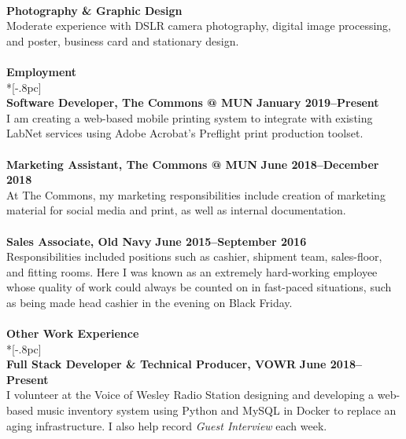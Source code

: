 \documentclass[letterpaper]{article}
\let\dateshape\bf
\begin{document}
\\
{\bf Photography \& Graphic Design} \\
Moderate experience with DSLR camera photography, digital image processing, and poster, business card and stationary design.  \\
\\[0.5pc]
{\large \bf Employment} \\*[-.8pc]
\underline{\hspace{\textwidth}} \\[0.5pc]
{\bf Software Developer, The Commons @ MUN } \hfill {\dateshape January 2019--Present\/} \\
I am creating a web-based mobile printing system to integrate with existing LabNet
services using Adobe Acrobat's Preflight print production toolset. \\
\\
{\bf Marketing Assistant, The Commons @ MUN } \hfill {\dateshape June 2018--December 2018\/} \\
At The Commons, my marketing responsibilities include creation of marketing 
material for social media and print, as well as internal documentation. \\
\\
{\bf Sales Associate, Old Navy } \hfill {\dateshape June 2015--September 2016\/} \\
Responsibilities included positions such as cashier, shipment team, sales-floor,
and fitting rooms. Here I was known as an extremely hard-working employee whose
quality of work could always be counted on in fast-paced situations, such as 
being made head cashier in the evening on Black Friday. \\
\\[0.5pc] %
{\large \bf Other Work Experience} \\*[-.8pc]
\underline{\hspace{\textwidth}} \\[0.5pc]
{\bf Full Stack Developer \& Technical Producer, VOWR} \hfill {\dateshape June 2018--Present\/} \\
I volunteer at the Voice of Wesley Radio Station designing and developing a web-based music inventory system using Python and MySQL in Docker to replace an aging infrastructure. I also help record {\em Guest Interview} each week. \\
\end{document}
